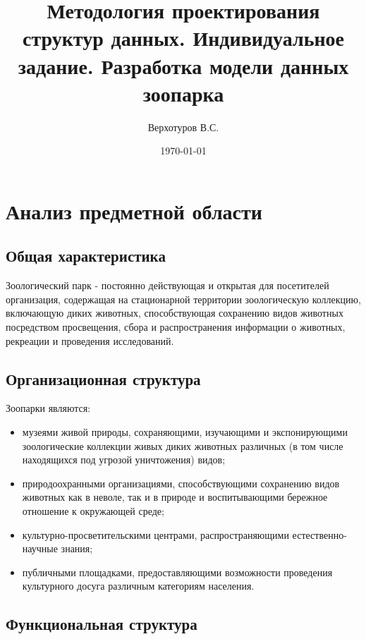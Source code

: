 \documentclass[10pt, a4paper, titlepage]{article}
\title{Методология проектирования структур данных. Индивидуальное задание. Разработка модели данных зоопарка}
\author{Верхотуров В.С.}
\affil{БСБО-05-20}
\affil{РТУ МИРЭА}
\date\today
\begin{document}
\maketitle

\tableofcontents
\newpage

\section{Анализ предметной области}

\subsection{Общая характеристика}

Зоологический парк - постоянно действующая и открытая для посетителей организация, содержащая на стационарной территории зоологическую коллекцию, включающую диких животных, способствующая сохранению видов животных посредством просвещения, сбора и распространения информации о животных, рекреации и проведения исследований.


\subsection{Организационная структура}

Зоопарки являются:
\begin{itemize}
    \item музеями живой природы, сохраняющими, изучающими и экспонирующими зоологические коллекции живых диких животных различных (в том числе находящихся под угрозой уничтожения) видов;
    
    \item природоохранными организациями, способствующими сохранению видов животных как в неволе, так и в природе и воспитывающими бережное отношение к окружающей среде;
    
    \item культурно-просветительскими центрами, распространяющими е\-сте\-стве\-нно-на\-уч\-ны\-е знания;
    
    \item публичными площадками, предоставляющими возможности проведения культурного досуга различным категориям населения.
\end{itemize}

\subsection{Функциональная структура}
\end{document}
